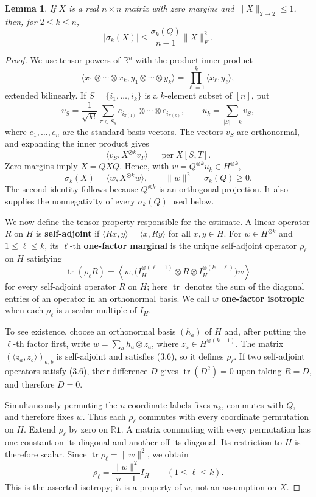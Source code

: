 \documentclass[10pt,a4paper]{amsart}
\newtheorem{lemma}[theorem]{Lemma}
\begin{document}
\begin{lemma}
If $X$ is a real $n\times n$ matrix with zero margins and
$\|X\|_{2\to2}\le1$, then, for
$2\le k\le n$,
\[
|\sigma_k(X)|\le
\frac{\sigma_k(Q)}{n-1}\|X\|_F^2.
\tag{3.2}
\]
\end{lemma}

\begin{proof}
We use tensor powers of $\mathbb R^n$ with the product inner
product
\[
\langle x_1\otimes\cdots\otimes x_k,
y_1\otimes\cdots\otimes y_k\rangle
=\prod_{\ell=1}^k\langle x_\ell,y_\ell\rangle,
\]
extended bilinearly. If $S=\{i_1,\ldots,i_k\}$ is a $k$-element subset of
$[n]$, put
\[
v_S=\frac1{\sqrt{k!}}\sum_{\pi\in S_k}
e_{i_{\pi(1)}}\otimes\cdots\otimes e_{i_{\pi(k)}},
\qquad
u_k=\sum_{|S|=k}v_S,
\tag{3.3}
\]
where $e_1,\ldots,e_n$ are the standard basis vectors. The vectors $v_S$
are orthonormal, and expanding the inner product gives
\[
\langle v_S,X^{\otimes k}v_T\rangle=\operatorname{per}X[S,T].
\tag{3.4}
\]
Zero margins imply $X=QXQ$. Hence, with
$w=Q^{\otimes k}u_k\in H^{\otimes k}$,
\[
\sigma_k(X)=\langle w,X^{\otimes k}w\rangle,
\qquad
\|w\|^2=\sigma_k(Q)\ge0.
\tag{3.5}
\]
The second identity follows because $Q^{\otimes k}$ is an orthogonal
projection. It also supplies the nonnegativity of every $\sigma_k(Q)$ used
below.

We now define the tensor property responsible for the estimate. A linear
operator $R$ on $H$ is \textbf{self-adjoint} if
$\langle Rx,y\rangle=\langle x,Ry\rangle$ for all $x,y\in H$. For
$w\in H^{\otimes k}$ and $1\le\ell\le k$, its $\ell$-th \textbf{one-factor
marginal} is the unique self-adjoint operator $\rho_\ell$ on $H$ satisfying
\[
\operatorname{tr}(\rho_\ell R)=
\left\langle w,
\bigl(I_H^{\otimes(\ell-1)}\otimes R\otimes
I_H^{\otimes(k-\ell)}\bigr)w\right\rangle
\tag{3.6}
\]
for every self-adjoint operator $R$ on $H$; here $\operatorname{tr}$ denotes
the sum of the diagonal entries of an operator in an orthonormal basis. We
call $w$ \textbf{one-factor isotropic} when each $\rho_\ell$ is a scalar multiple
of $I_H$.

To see existence, choose an orthonormal basis $(h_a)$ of $H$ and, after putting
the $\ell$-th factor first, write $w=\sum_a h_a\otimes z_a$, where
$z_a\in H^{\otimes(k-1)}$. The matrix
$(\langle z_a,z_b\rangle)_{a,b}$ is self-adjoint and satisfies (3.6), so it
defines $\rho_\ell$. If two self-adjoint operators satisfy (3.6), their
difference $D$ gives $\operatorname{tr}(D^2)=0$ upon taking $R=D$, and therefore
$D=0$.

Simultaneously permuting the $n$ coordinate labels fixes $u_k$, commutes with
$Q$, and therefore fixes $w$. Thus each $\rho_\ell$ commutes with every
coordinate permutation on $H$. Extend $\rho_\ell$ by zero on
$\mathbb R\mathbf1$. A matrix commuting with every permutation has one
constant on its diagonal and another off its diagonal. Its restriction to
$H$ is therefore scalar. Since
$\operatorname{tr}\rho_\ell=\|w\|^2$, we obtain
\[
\rho_\ell=\frac{\|w\|^2}{n-1}I_H
\qquad(1\le\ell\le k).
\tag{3.7}
\]
This is the asserted isotropy; it is a property of $w$, not an assumption on
$X$.


\end{proof}
\end{document}
